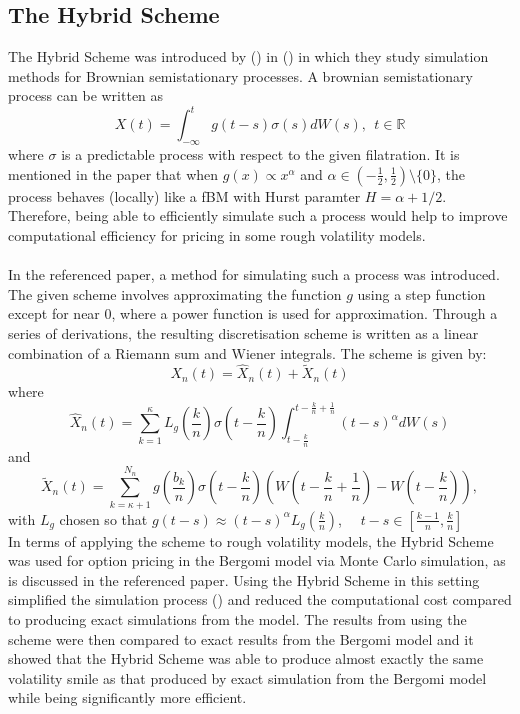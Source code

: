 \documentclass[12pt,oneside]{article}
\begin{document}
\subsection{The Hybrid Scheme}
The Hybrid Scheme was introduced by (\cite{BENNEDSON}) in (\cite{PAPER}) in which they study simulation methods for Brownian semistationary processes. A brownian semistationary process can be written as $$X(t)=\int_{-\infty}^t g(t-s) \sigma(s) dW(s),  \ \  t\in\mathbb{R}$$ where $\sigma$ is a predictable process with respect to the given filatration. It is mentioned in the paper that when $g(x) \propto x^\alpha$ and $\alpha \in (-\frac{1}{2}, \frac{1}{2}) \setminus \{0\}$, the process behaves (locally) like a fBM with Hurst paramter $H=\alpha+1/2$.  Therefore, being able to efficiently simulate such a process would help to improve computational efficiency for pricing in some rough volatility models.  
\\
\\
In the referenced paper, a method for simulating such a process was introduced. The given scheme involves approximating the function $g$ using a step function except for near 0, where a power function is used for approximation. Through a series of derivations,  the resulting discretisation scheme is written as a linear combination of a Riemann sum and Wiener integrals. The scheme is given by: $$X_n(t) = \hat{X}_n(t) + \tilde{X}_n(t)$$ where $$\hat{X}_n(t) = \sum_{k=1}^{\kappa} L_g(\frac{k}{n}) \sigma (t-\frac{k}{n}) \int_{t-\frac{k}{n}}^{t-\frac{k}{n}+\frac{1}{n}}(t-s)^\alpha dW(s)$$ and $$\tilde{X}_n(t) = \sum_{k=\kappa+1}^{N_n}g(\frac{b_k}{n})\sigma(t-\frac{k}{n})(W(t-\frac{k}{n}+\frac{1}{n})-W(t-\frac{k}{n})),$$ with $L_g$ chosen so that $g(t-s) \approx (t-s)^\alpha L_g(\frac{k}{n})$, \ \ $t-s \in [\frac{k-1}{n},\frac{k}{n}]$
\\
In terms of applying the scheme to rough volatility models, the Hybrid Scheme was used for option pricing in the Bergomi model via Monte Carlo simulation, as is discussed in the referenced paper. Using the Hybrid Scheme in this setting simplified the simulation process (\cite{see page 20 of BENNEDSON}) and reduced the computational cost compared to producing exact simulations from the model.  The results from using the scheme were then compared to exact results from the Bergomi model and it showed that the Hybrid Scheme was able to produce almost exactly the same volatility smile as that produced by exact simulation from the Bergomi model while being significantly more efficient.
\end{document}
